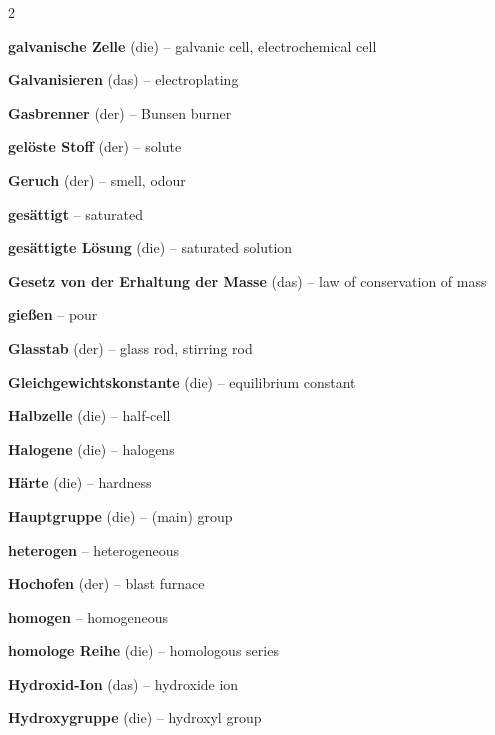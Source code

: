\begin{multicols}{2}
\par\nopagebreak
\textbf{galvanische Zelle} (die) -- galvanic cell, electrochemical cell\dotfill\hyperref[e:200]{\pageref*{e:200}}\par
\textbf{Galvanisieren} (das) -- electroplating\dotfill\hyperref[e:205]{\pageref*{e:205}}\par
\textbf{Gasbrenner} (der) -- Bunsen burner\dotfill\hyperref[e:46]{\pageref*{e:46}}\par
\textbf{gelöste Stoff} (der) -- solute\dotfill\hyperref[e:10]{\pageref*{e:10}}\par
\textbf{Geruch} (der) -- smell, odour\dotfill\hyperref[e:22]{\pageref*{e:22}}\par
\textbf{gesättigt} -- saturated\dotfill\hyperref[e:214]{\pageref*{e:214}}\par
\textbf{gesättigte Lösung} (die) -- saturated solution\dotfill\hyperref[e:14]{\pageref*{e:14}}\par
\textbf{Gesetz von der Erhaltung der Masse} (das) -- law of conservation of mass\dotfill\hyperref[e:149]{\pageref*{e:149}}\par
\textbf{gießen} -- pour\dotfill\hyperref[e:68]{\pageref*{e:68}}\par
\textbf{Glasstab} (der) -- glass rod, stirring rod\dotfill\hyperref[e:53]{\pageref*{e:53}}\par
\textbf{Gleichgewichtskonstante} (die) -- equilibrium constant\dotfill\hyperref[e:146]{\pageref*{e:146}}\par

\par\nopagebreak
\textbf{Halbzelle} (die) -- half-cell\dotfill\hyperref[e:201]{\pageref*{e:201}}\par
\textbf{Halogene} (die) -- halogens\dotfill\hyperref[e:90]{\pageref*{e:90}}\par
\textbf{Härte} (die) -- hardness\dotfill\hyperref[e:23]{\pageref*{e:23}}\par
\textbf{Hauptgruppe} (die) -- (main) group\dotfill\hyperref[e:87]{\pageref*{e:87}}\par
\textbf{heterogen} -- heterogeneous\dotfill\hyperref[e:7]{\pageref*{e:7}}\par
\textbf{Hochofen} (der) -- blast furnace\dotfill\hyperref[e:207]{\pageref*{e:207}}\par
\textbf{homogen} -- homogeneous\dotfill\hyperref[e:6]{\pageref*{e:6}}\par
\textbf{homologe Reihe} (die) -- homologous series\dotfill\hyperref[e:213]{\pageref*{e:213}}\par
\textbf{Hydroxid-Ion} (das) -- hydroxide ion\dotfill\hyperref[e:165]{\pageref*{e:165}}\par
\textbf{Hydroxygruppe} (die) -- hydroxyl group\dotfill\hyperref[e:220]{\pageref*{e:220}}\par


\end{multicols}
